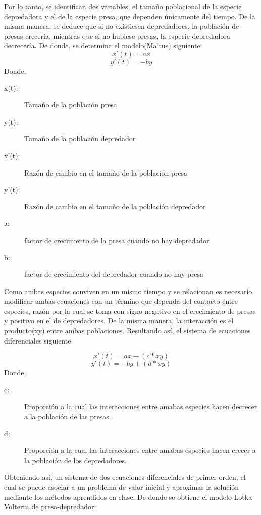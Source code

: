 \documentclass[10pt,letterpaper]{article}
\begin{document}
Por lo tanto, se identifican dos variables, el tamaño poblacional de la especie depredadora y el de la especie presa, que dependen únicamente del tiempo. De la misma manera, se deduce que si no existiesen depredadores, la población de presas crecería, mientras que si no hubiese presas, la especie depredadora decrecería. De donde, se  determina el modelo(Maltus) siguiente:\\
\[	x'(t)=ax \]
\[	y'(t)=-by\]
Donde, 
\begin{description}
\item[x(t):] Tamaño de la población presa
	
\item[y(t):] Tamaño de la población depredador
	
\item[x'(t):] Razón de cambio en el tamaño de la población presa

\item[y'(t):] Razón de cambio en el tamaño de la población depredador
	
\item[a:] factor de crecimiento de la presa cuando no hay depredador
	
\item[b:] factor de crecimiento del depredador cuando no hay presa
\end{description} 

Como ambas especies conviven en un mismo tiempo y se relacionan es necesario modificar ambas ecuaciones con un término que dependa del contacto entre especies, razón por la cual se toma con signo negativo en el crecimiento de presas y positivo en el de depredadores. De la misma manera, la interacción es el producto(xy) entre ambas poblaciones. Resultando así, el sistema de ecuaciones diferenciales siguiente

 \[	x'(t)=ax - (c*xy)\]
 \[	y'(t)=-by + (d*xy)\]
 Donde, 
 \begin{description}
 \item[c:] Proporción a la cual las interacciones entre amabas especies hacen decrecer a la población de las presas.
	
 \item[d:] Proporción a la cual las interacciones entre amabas especies hacen crecer a la población de los depredadores.\\
 \end{description} 	

Obteniendo así, un sistema de dos ecuaciones diferenciales de primer orden, el cual se puede asociar a un problema de valor inicial y aproximar la solución mediante los métodos aprendidos en clase. De donde se obtiene el modelo Lotka-Volterra de presa-depredador:  
\end{document}
